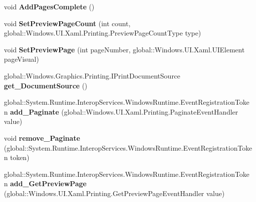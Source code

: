 \begin{DoxyCompactItemize}
void {\bfseries Add\+Pages\+Complete} ()
\item 
\mbox{\label{interface_windows_1_1_u_i_1_1_xaml_1_1_printing_1_1_i_print_document_a3fad032cb5b86f827a5b5428c9ba1d34}} 
void {\bfseries Set\+Preview\+Page\+Count} (int count, global\+::\+Windows.\+U\+I.\+Xaml.\+Printing.\+Preview\+Page\+Count\+Type type)
\item 
\mbox{\label{interface_windows_1_1_u_i_1_1_xaml_1_1_printing_1_1_i_print_document_a2fb474592368092099efc8562a7c1bb6}} 
void {\bfseries Set\+Preview\+Page} (int page\+Number, global\+::\+Windows.\+U\+I.\+Xaml.\+U\+I\+Element page\+Visual)
\item 
\mbox{\label{interface_windows_1_1_u_i_1_1_xaml_1_1_printing_1_1_i_print_document_a42077e57d55ca55665d043d48da3ec8a}} 
global\+::\+Windows.\+Graphics.\+Printing.\+I\+Print\+Document\+Source {\bfseries get\+\_\+\+Document\+Source} ()
\item 
\mbox{\label{interface_windows_1_1_u_i_1_1_xaml_1_1_printing_1_1_i_print_document_a9dbc873132dc18654e2b7e972080c41e}} 
global\+::\+System.\+Runtime.\+Interop\+Services.\+Windows\+Runtime.\+Event\+Registration\+Token {\bfseries add\+\_\+\+Paginate} (global\+::\+Windows.\+U\+I.\+Xaml.\+Printing.\+Paginate\+Event\+Handler value)
\item 
\mbox{\label{interface_windows_1_1_u_i_1_1_xaml_1_1_printing_1_1_i_print_document_a799ea5a2c39144ec765078426a3efac8}} 
void {\bfseries remove\+\_\+\+Paginate} (global\+::\+System.\+Runtime.\+Interop\+Services.\+Windows\+Runtime.\+Event\+Registration\+Token token)
\item 
\mbox{\label{interface_windows_1_1_u_i_1_1_xaml_1_1_printing_1_1_i_print_document_acb9d671a3b4a58e885771c4ec6c329d5}} 
global\+::\+System.\+Runtime.\+Interop\+Services.\+Windows\+Runtime.\+Event\+Registration\+Token {\bfseries add\+\_\+\+Get\+Preview\+Page} (global\+::\+Windows.\+U\+I.\+Xaml.\+Printing.\+Get\+Preview\+Page\+Event\+Handler value)

\end{DoxyCompactItemize}
